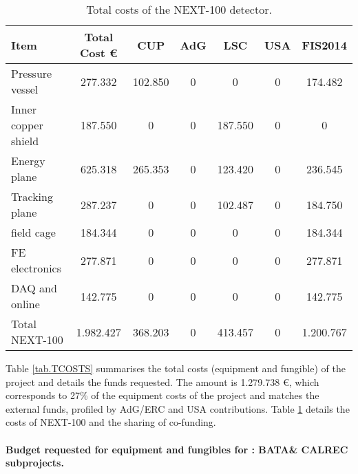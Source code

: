 %
\begin{table}[h!]
\begin{center}
\begin{tabular}{|l|c|c|c|c|c|c|}
\hline
 Item & Total Cost \euro & CUP	&AdG &	LSC & USA &	FIS2014 \\
 \hline
 Pressure vessel &	 277.332 & 	 102.850 & 	 0 & 	 0 & 	 0 & 	 174.482 \\ 
Inner copper shield &	 187.550 & 	 0 & 	 0 & 	 187.550 & 	 0 & 	 0 \\ 
Energy plane	& 625.318 & 	 265.353 & 	 0 & 	 123.420 & 	 0 & 	 236.545 \\ 
Tracking plane	&  287.237 & 	 0 & 	 0 & 	 102.487 & 	 0 & 	 184.750 \\ 
field cage	 & 184.344 & 	 0 & 	 0 & 	 0 & 	 0 & 	 184.344 \\ 
FE electronics	& 277.871 & 	 0 & 	 0 & 	 0 & 	 0 & 	 277.871 \\
DAQ and online &	 142.775 & 	 0 & 	 0 & 	 0 & 	 0 & 	 142.775 \\ 
Total NEXT-100	 & 1.982.427 & 	 368.203 & 	 0 & 	 413.457 & 	 0 & 	 1.200.767 \\ 
  \hline\hline
\end{tabular}  
\caption{Total costs of the NEXT-100 detector.}
\label{tab.TN100}
\end{center}
\end{table} 
 
Table \ref{tab.TCOSTS} summarises the total costs (equipment and fungible) of the project and details the funds requested. The amount is 1.279.738 \euro, which corresponds to 27\% of the equipment costs of the project and matches the external funds, profiled by AdG/ERC and USA contributions. 
Table \ref{tab.TN100} details the costs of NEXT-100 and the sharing of co-funding. 

\paragraph{Budget requested for equipment and fungibles for \BATA: BATA\& CALREC subprojects.}

